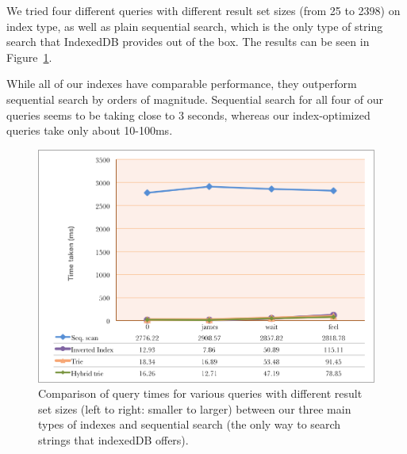 \documentclass{vldb}
\begin{document}
We tried four different queries with different result set sizes (from 25 to 2398) on index type, as well as plain sequential search, which is the only type of string search that IndexedDB provides out of the box. The results can be seen in Figure~\ref{querytimes}.

While all of our indexes have comparable performance, they outperform sequential search by orders of magnitude. Sequential search for all four of our queries seems to be taking close to 3 seconds, whereas our index-optimized queries take only about 10-100ms. 

\begin{figure}
   \includegraphics[scale=.53]{query-times}
  \caption{Comparison of query times for various queries with different result set sizes (left to right: smaller to larger) between our three main types of indexes and sequential search (the only way to search strings that indexedDB offers). }
  \label{querytimes}
\end{figure}
\end{document}
